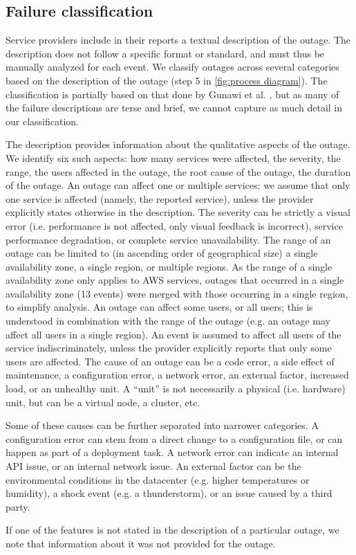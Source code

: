 \subsection{Failure classification}
Service providers include in their reports a textual description of the outage.
The description does not follow a specific format or standard, and must thus be manually analyzed for each event.
We classify outages across several categories based on the description of the outage (step 5 in \autoref{fig:process diagram}).
The classification is partially based on that done by Gunawi et al. \cite{gunawi2016, gunawi2014}, but as many of the failure descriptions are terse and brief, we cannot capture as much detail in our classification.

The description provides information about the qualitative aspects of the outage.
We identify six such aspects: how many services were affected, the severity, the range, the users affected in the outage, the root cause of the outage, the duration of the outage.
An outage can affect one or multiple services; we assume that only one service is affected (namely, the reported service), unless the provider explicitly states otherwise in the description.
The severity can be strictly a visual error (i.e. performance is not affected, only visual feedback is incorrect), service performance degradation, or complete service unavailability.
The range of an outage can be limited to (in ascending order of geographical size) a single availability zone, a single region, or multiple regions.
As the range of a single availability zone only applies to AWS services, outages that occurred in a single availability zone (13 events) were merged with those occurring in a single region, to simplify analysis.
An outage can affect some users, or all users; this is understood in combination with the range of the outage (e.g. an outage may affect all users in a single region).
An event is assumed to affect all users of the service indiscriminately, unless the provider explicitly reports that only some users are affected.
The cause of an outage can be a code error, a side effect of maintenance, a configuration error, a network error, an external factor, increased load, or an unhealthy unit.
A ``unit'' is not necessarily a physical (i.e. hardware) unit, but can be a virtual node, a cluster, etc.

Some of these causes can be further separated into narrower categories.
A configuration error can stem from a direct change to a configuration file, or can happen as part of a deployment task.
A network error can indicate an internal API issue, or an internal network issue.
An external factor can be the environmental conditions in the datacenter (e.g. higher temperatures or humidity), a shock event (e.g. a thunderstorm), or an issue caused by a third party.

If one of the features is not stated in the description of a particular outage, we note that information about it was not provided for the outage.
